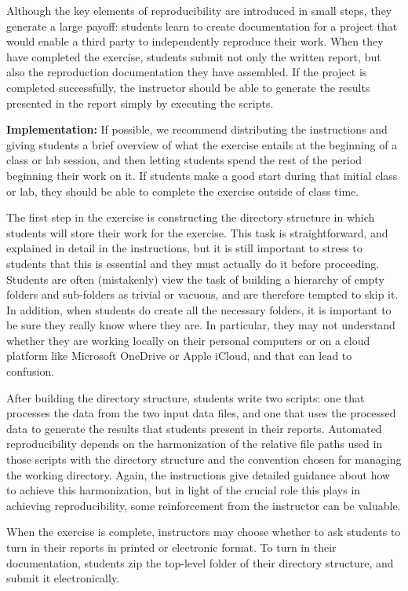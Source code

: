 \documentclass[
  12pt]{article}
\begin{document}
Although the key elements of reproducibility are introduced in small steps, they generate a large payoff:  students learn to create documentation for a project that would enable a third party to independently reproduce their work. 
When they have completed the exercise, students submit not only the written report, but also the reproduction documentation they have assembled.
If the project is completed successfully, the instructor should be able to generate the results presented in the report simply by executing the scripts.

\textbf{Implementation:} If possible, we recommend distributing the instructions and giving students a brief overview of what the exercise entails at the beginning of a class or lab session, and then letting students spend the rest of the period beginning their work on it.
If students make a good start during that initial class or lab, they should be able to complete the exercise outside of class time.

The first step in the exercise is constructing the directory structure in which students will store their work for the exercise.  
This task is straightforward, and explained in detail in the instructions, but it is still important to stress to students that this is essential and they must actually do it before proceeding.  
Students are often (mistakenly) view the task of building a hierarchy of empty folders and sub-folders as trivial or vacuous, and are therefore tempted to skip it.  
In addition, when students do create all the necessary folders, it is important to be sure they really know where they are.  
In particular, they may not understand whether they are working locally on their personal computers or on a cloud platform like Microsoft OneDrive or Apple iCloud, and that can lead to confusion.

After building the directory structure, students write two scripts: one that processes the data from the two input data files, and one that uses the processed data to generate the results that students present in their reports.  
Automated reproducibility depends on the harmonization of the relative file paths used in those scripts with the directory structure and the convention chosen for managing the working directory.
Again, the instructions give detailed guidance about how to achieve this harmonization, but in light of the crucial role this plays in achieving reproducibility, some reinforcement from the instructor can be valuable.

When the exercise is complete, instructors may choose whether to ask students to turn in their reports in printed or electronic format.  
To turn in their documentation, students zip the top-level folder of their directory structure, and submit it electronically.
\end{document}
